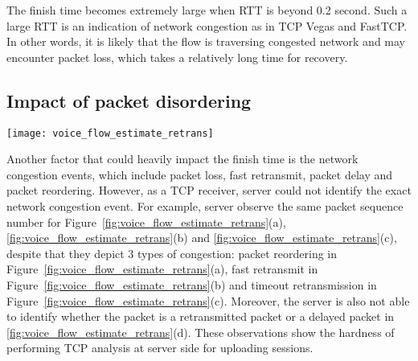 The finish time becomes extremely large when RTT is beyond 0.2 second. Such a large RTT is an indication of network congestion as in TCP Vegas\cite{brakmo1995tcp} and FastTCP\cite{wei2006fast}. In other words, it is likely that the flow is traversing congested network and may encounter packet loss, which takes a relatively long time for recovery.

\subsection{Impact of packet disordering}
\label{sec:v_pd}


\begin{figure*}[th]
\centering
	\texttt{[image: voice\_flow\_estimate\_retrans]}
\caption{Server could not distinguish packet reordering events, which are (a) network reordering, (b) fast retransmit, and (c) timeout retransmission. Server may identify some timeout retransmissions as long packet delay (d).}
\label{fig:voice_flow_estimate_retrans}
\end{figure*}

Another factor that could heavily impact the finish time is the network congestion events, which include packet loss, fast retransmit, packet delay and packet reordering. However, as a TCP receiver, server could not identify the exact network congestion event. For example, server observe the same packet sequence number for Figure~\ref{fig:voice_flow_estimate_retrans}(a), \ref{fig:voice_flow_estimate_retrans}(b) and \ref{fig:voice_flow_estimate_retrans}(c), despite that they depict 3 types of congestion: packet reordering in Figure~\ref{fig:voice_flow_estimate_retrans}(a), fast retransmit in Figure~\ref{fig:voice_flow_estimate_retrans}(b) and timeout retransmission in Figure~\ref{fig:voice_flow_estimate_retrans}(c). Moreover, the server is also not able to identify whether the packet is a retransmitted packet or a delayed packet in \ref{fig:voice_flow_estimate_retrans}(d). These observations show the hardness of performing TCP analysis at server side for uploading sessions. 


